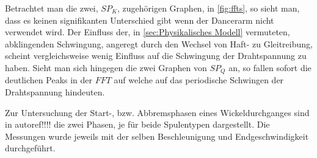 Betrachtet man die zwei, $SP_K$, zugehörigen Graphen, in \autoref{fig:ffts}, so sieht man, dass es keinen signifikanten Unterschied gibt wenn der Dancerarm nicht verwendet wird. Der Einfluss der, in \autoref{sec:Physikalisches Modell} vermuteten, abklingenden Schwingung, angeregt durch den Wechsel von Haft- zu Gleitreibung, scheint vergleichsweise wenig Einfluss auf die Schwingung der Drahtspannung zu haben. Sieht man sich hingegen die zwei Graphen von $SP_Q$ an, so fallen sofort die deutlichen Peaks in der $FFT$ auf  welche auf das periodische Schwingen der Drahtspannung hindeuten.





Zur Untersuchung der Start-, bzw. Abbremsphasen eines Wickeldurchganges sind in autoref{}!!!! die zwei Phasen, je für beide Spulentypen dargestellt. Die Messungen wurde jeweils mit der selben Beschleunigung und Endgeschwindigkeit durchgeführt.









